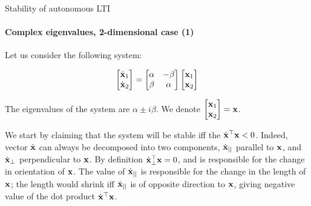 \documentclass{beamer}
\begin{document}
\begin{frame}{Stability of autonomous LTI}
\framesubtitle{Complex eigenvalues, 2-dimensional case (1)}
\begin{flushleft}

Let us consider the following system:

\begin{equation}
\begin{bmatrix}
    \dot{\mathbf{x}}_1 \\ \dot{\mathbf{x}}_2
\end{bmatrix}
     = 
\begin{bmatrix}
    \alpha & -\beta \\ \beta & \alpha
\end{bmatrix}     
\begin{bmatrix}
    \mathbf{x}_1 \\ \mathbf{x}_2
\end{bmatrix}
\end{equation}

The eigenvalues of the system are $\alpha \pm i \beta$. We denote $\begin{bmatrix}
    \mathbf{x}_1 \\ \mathbf{x}_2
\end{bmatrix} = \mathbf{x}$.

\bigskip

We start by claiming that the system will be stable iff the $\dot{\mathbf{x}}^\top \mathbf{x} < 0$. Indeed, vector $\dot{\mathbf{x}}$ can always be decomposed into two components, $\dot{\mathbf{x}}_{||}$ parallel to $\mathbf{x}$, and $\dot{\mathbf{x}}_{\perp}$ perpendicular to $\mathbf{x}$. By definition $\dot{\mathbf{x}}_{\perp}^\top \mathbf{x} = 0$, and is responsible for the change in orientation of $\mathbf{x}$. The value of $\dot{\mathbf{x}}_{||}$ is responsible for the change in the length of $\mathbf{x}$; the length would shrink iff $\dot{\mathbf{x}}_{||}$ is of opposite direction to $\mathbf{x}$, giving negative value of the dot product $\dot{\mathbf{x}}^\top \mathbf{x}$.

\end{flushleft}
\end{frame}
\end{document}
